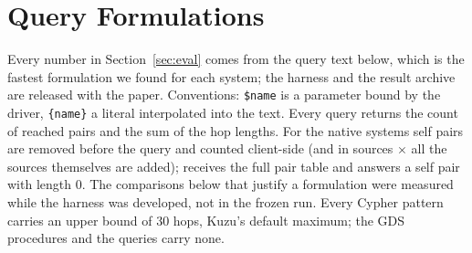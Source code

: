 \appendix
\section{Query Formulations}
\label{sec:appendix-queries}


Every number in Section~\ref{sec:eval} comes from the query text below, which is the fastest formulation we found for
each system; the harness and the result archive are released with the paper. Conventions: \texttt{\$name} is a
parameter bound by the driver, \texttt{\{name\}} a literal interpolated into the text. Every query returns the count of
reached pairs and the sum of the hop lengths. For the native systems self pairs are removed before the query and
counted client-side (and in sources $\times$ all the sources themselves are added); \duckpgq receives the full pair
table and answers a self pair with length 0. The comparisons below that justify a formulation were measured while the
harness was developed, not in the frozen run. Every Cypher pattern carries an upper bound of 30 hops, Kuzu's default
maximum; the GDS procedures and the \duckpgq queries carry none.

